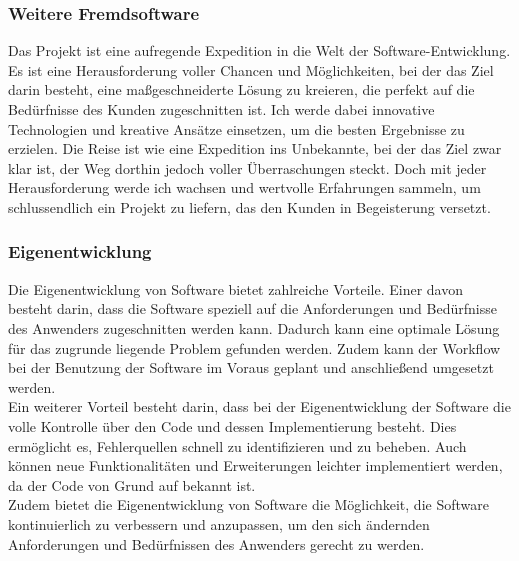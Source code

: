 \begin{flushleft}
\subsubsection{Weitere Fremdsoftware}
Das Projekt ist eine aufregende Expedition in die Welt der Software-Entwicklung.
Es ist eine Herausforderung voller Chancen und Möglichkeiten, bei der das Ziel darin besteht,
eine maßgeschneiderte Lösung zu kreieren, die perfekt auf die Bedürfnisse des Kunden zugeschnitten ist.
Ich werde dabei innovative Technologien und kreative Ansätze einsetzen, um die besten Ergebnisse zu erzielen.
Die Reise ist wie eine Expedition ins Unbekannte, bei der das Ziel zwar klar ist, der Weg dorthin jedoch voller Überraschungen steckt.
Doch mit jeder Herausforderung werde ich wachsen und wertvolle Erfahrungen sammeln, um schlussendlich ein Projekt zu liefern, das den Kunden in Begeisterung versetzt.


\subsubsection{Eigenentwicklung}
Die Eigenentwicklung von Software bietet zahlreiche Vorteile. Einer davon besteht darin, dass die Software speziell auf die Anforderungen und Bedürfnisse des Anwenders zugeschnitten werden kann. Dadurch kann eine optimale Lösung für das zugrunde liegende Problem gefunden werden. Zudem kann der Workflow bei der Benutzung der Software im Voraus geplant und anschließend umgesetzt werden.
\\
Ein weiterer Vorteil besteht darin, dass bei der Eigenentwicklung der Software die volle Kontrolle über den Code und dessen Implementierung besteht. Dies ermöglicht es, Fehlerquellen schnell zu identifizieren und zu beheben. Auch können neue Funktionalitäten und Erweiterungen leichter implementiert werden, da der Code von Grund auf bekannt ist.
\\
Zudem bietet die Eigenentwicklung von Software die Möglichkeit, die Software kontinuierlich zu verbessern und anzupassen, um den sich ändernden Anforderungen und Bedürfnissen des Anwenders gerecht zu werden.


\end{flushleft}
